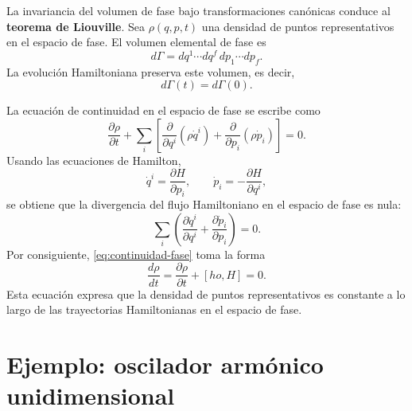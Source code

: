 \documentclass[../apunte_mecanica_clasica.tex]{subfiles}
\begin{document}
La invariancia del volumen de fase bajo transformaciones canónicas conduce al \textbf{teorema de Liouville}. Sea $\rho(q,p,t)$ una densidad de puntos representativos en el espacio de fase. El volumen elemental de fase es
\begin{equation}
    d\Gamma=dq^1\cdots dq^f\,dp_1\cdots dp_f.
    \label{eq:volumen-fase-elemental}
\end{equation}
La evolución Hamiltoniana preserva este volumen, es decir,
\begin{equation}
    d\Gamma(t)=d\Gamma(0).
    \label{eq:liouville-volumen}
\end{equation}

La ecuación de continuidad en el espacio de fase se escribe como
\begin{equation}
    \frac{\partial \rho}{\partial t}
    +
    \sum_i
    \left[
    \frac{\partial}{\partial q^i}(\rho\dot q^i)
    +
    \frac{\partial}{\partial p_i}(\rho\dot p_i)
    \right]
    =0.
    \label{eq:continuidad-fase}
\end{equation}
Usando las ecuaciones de Hamilton,
\begin{equation}
    \dot q^i=\frac{\partial H}{\partial p_i},
    \qquad
    \dot p_i=-\frac{\partial H}{\partial q^i},
    \label{eq:hamilton-liouville}
\end{equation}
se obtiene que la divergencia del flujo Hamiltoniano en el espacio de fase es nula:
\begin{equation}
    \sum_i
    \left(
    \frac{\partial \dot q^i}{\partial q^i}
    +
    \frac{\partial \dot p_i}{\partial p_i}
    \right)
    =0.
    \label{eq:divergencia-flujo-hamiltoniano}
\end{equation}
Por consiguiente, \eqref{eq:continuidad-fase} toma la forma
\begin{equation}
    \frac{d\rho}{dt}
    =
    \frac{\partial \rho}{\partial t}+[
ho,H]=0.
    \label{eq:teorema-liouville}
\end{equation}
Esta ecuación expresa que la densidad de puntos representativos es constante a lo largo de las trayectorias Hamiltonianas en el espacio de fase.

\section{Ejemplo: oscilador armónico unidimensional}
\end{document}
